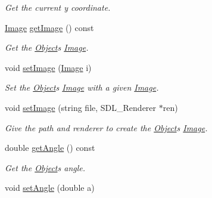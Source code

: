 \begin{DoxyCompactItemize}
\begin{DoxyCompactList}\small\item\em Get the current y coordinate. \end{DoxyCompactList}\item 
\hyperlink{classImage}{Image} \hyperlink{classObject_a76748c591087e0a3c676daea6f257e08}{get\+Image} () const \hypertarget{classObject_a76748c591087e0a3c676daea6f257e08}{}\label{classObject_a76748c591087e0a3c676daea6f257e08}

\begin{DoxyCompactList}\small\item\em Get the \hyperlink{classObject}{Object}\textquotesingle{}s \hyperlink{classImage}{Image}. \end{DoxyCompactList}\item 
void \hyperlink{classObject_a131f81446cda68e47ee7e94d247e6ea1}{set\+Image} (\hyperlink{classImage}{Image} i)\hypertarget{classObject_a131f81446cda68e47ee7e94d247e6ea1}{}\label{classObject_a131f81446cda68e47ee7e94d247e6ea1}

\begin{DoxyCompactList}\small\item\em Set the \hyperlink{classObject}{Object}\textquotesingle{}s \hyperlink{classImage}{Image} with a given \hyperlink{classImage}{Image}. \end{DoxyCompactList}\item 
void \hyperlink{classObject_a7f984ff2fb0c60b942a1018fc48417ae}{set\+Image} (string file, S\+D\+L\+\_\+\+Renderer $\ast$ren)\hypertarget{classObject_a7f984ff2fb0c60b942a1018fc48417ae}{}\label{classObject_a7f984ff2fb0c60b942a1018fc48417ae}

\begin{DoxyCompactList}\small\item\em Give the path and renderer to create the \hyperlink{classObject}{Object}\textquotesingle{}s \hyperlink{classImage}{Image}. \end{DoxyCompactList}\item 
double \hyperlink{classObject_aaba7ccef31e74246abda5ef9cb2e202c}{get\+Angle} () const \hypertarget{classObject_aaba7ccef31e74246abda5ef9cb2e202c}{}\label{classObject_aaba7ccef31e74246abda5ef9cb2e202c}

\begin{DoxyCompactList}\small\item\em Get the \hyperlink{classObject}{Object}\textquotesingle{}s angle. \end{DoxyCompactList}\item 
void \hyperlink{classObject_a17b2cae6baa17a776d13243841d39c77}{set\+Angle} (double a)\hypertarget{classObject_a17b2cae6baa17a776d13243841d39c77}{}\label{classObject_a17b2cae6baa17a776d13243841d39c77}


\end{DoxyCompactItemize}
